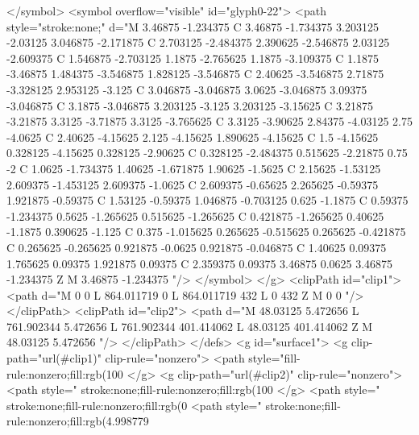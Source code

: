 </symbol>
<symbol overflow="visible" id="glyph0-22">
<path style="stroke:none;" d="M 3.46875 -1.234375 C 3.46875 -1.734375 3.203125 -2.03125 3.046875 -2.171875 C 2.703125 -2.484375 2.390625 -2.546875 2.03125 -2.609375 C 1.546875 -2.703125 1.1875 -2.765625 1.1875 -3.109375 C 1.1875 -3.46875 1.484375 -3.546875 1.828125 -3.546875 C 2.40625 -3.546875 2.71875 -3.328125 2.953125 -3.125 C 3.046875 -3.046875 3.0625 -3.046875 3.09375 -3.046875 C 3.1875 -3.046875 3.203125 -3.125 3.203125 -3.15625 C 3.21875 -3.21875 3.3125 -3.71875 3.3125 -3.765625 C 3.3125 -3.90625 2.84375 -4.03125 2.75 -4.0625 C 2.40625 -4.15625 2.125 -4.15625 1.890625 -4.15625 C 1.5 -4.15625 0.328125 -4.15625 0.328125 -2.90625 C 0.328125 -2.484375 0.515625 -2.21875 0.75 -2 C 1.0625 -1.734375 1.40625 -1.671875 1.90625 -1.5625 C 2.15625 -1.53125 2.609375 -1.453125 2.609375 -1.0625 C 2.609375 -0.65625 2.265625 -0.59375 1.921875 -0.59375 C 1.53125 -0.59375 1.046875 -0.703125 0.625 -1.1875 C 0.59375 -1.234375 0.5625 -1.265625 0.515625 -1.265625 C 0.421875 -1.265625 0.40625 -1.1875 0.390625 -1.125 C 0.375 -1.015625 0.265625 -0.515625 0.265625 -0.421875 C 0.265625 -0.265625 0.921875 -0.0625 0.921875 -0.046875 C 1.40625 0.09375 1.765625 0.09375 1.921875 0.09375 C 2.359375 0.09375 3.46875 0.0625 3.46875 -1.234375 Z M 3.46875 -1.234375 "/>
</symbol>
</g>
<clipPath id="clip1">
  <path d="M 0 0 L 864.011719 0 L 864.011719 432 L 0 432 Z M 0 0 "/>
</clipPath>
<clipPath id="clip2">
  <path d="M 48.03125 5.472656 L 761.902344 5.472656 L 761.902344 401.414062 L 48.03125 401.414062 Z M 48.03125 5.472656 "/>
</clipPath>
</defs>
<g id="surface1">
<g clip-path="url(#clip1)" clip-rule="nonzero">
<path style="fill-rule:nonzero;fill:rgb(100%
</g>
<g clip-path="url(#clip2)" clip-rule="nonzero">
<path style=" stroke:none;fill-rule:nonzero;fill:rgb(100%
</g>
<path style=" stroke:none;fill-rule:nonzero;fill:rgb(0%
<path style=" stroke:none;fill-rule:nonzero;fill:rgb(4.998779%
